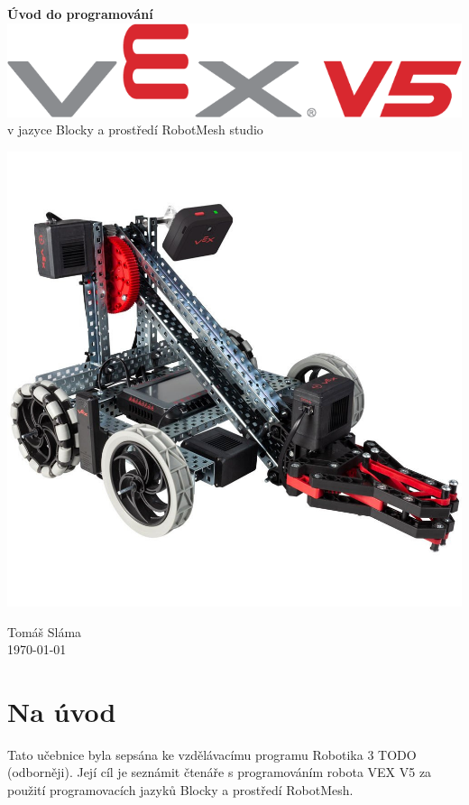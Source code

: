 


\begin{titlepage}
    \begin{center}
        \vspace*{3em}
        \Huge
				\textbf{Úvod do programování} \includegraphics[height=0.65\baselineskip]{Images/vex-logo.png}
				\\
				\Large
        \vspace*{0.5em}
				v jazyce Blocky a prostředí RobotMesh studio

        \vfill
				\includegraphics[width=0.7\linewidth]{Images/robot.jpg}
        \vfill

        \flushright
        \normalsize
				Tomáš Sláma\\
				\today
    \end{center}
\end{titlepage}

\tableofcontents
\clearpage

\setcounter{secnumdepth}{0}
\section{Na úvod}
Tato učebnice byla sepsána ke vzdělávacímu programu Robotika 3 TODO (odborněji). Její cíl je seznámit čtenáře s programováním robota VEX V5 za použití programovacích jazyků Blocky a prostředí RobotMesh.

